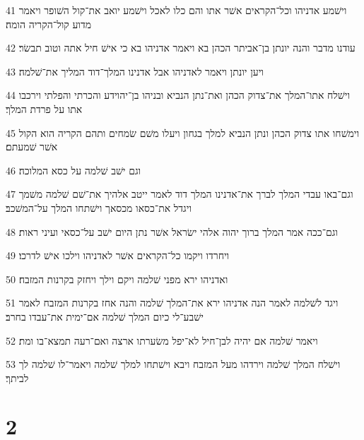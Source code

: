 \par 41 וישׁמע אדניהו וכל־הקראים אשׁר אתו והם כלו לאכל וישׁמע יואב את־קול השׁופר ויאמר מדוע קול־הקריה הומה׃
\par 42 עודנו מדבר והנה יונתן בן־אביתר הכהן בא ויאמר אדניהו בא כי אישׁ חיל אתה וטוב תבשׂר׃
\par 43 ויען יונתן ויאמר לאדניהו אבל אדנינו המלך־דוד המליך את־שׁלמה׃
\par 44 וישׁלח אתו־המלך את־צדוק הכהן ואת־נתן הנביא ובניהו בן־יהוידע והכרתי והפלתי וירכבו אתו על פרדת המלך׃
\par 45 וימשׁחו אתו צדוק הכהן ונתן הנביא למלך בגחון ויעלו משׁם שׂמחים ותהם הקריה הוא הקול אשׁר שׁמעתם׃
\par 46 וגם ישׁב שׁלמה על כסא המלוכה׃
\par 47 וגם־באו עבדי המלך לברך את־אדנינו המלך דוד לאמר ייטב אלהיך את־שׁם שׁלמה משׁמך ויגדל את־כסאו מכסאך וישׁתחו המלך על־המשׁכב׃
\par 48 וגם־ככה אמר המלך ברוך יהוה אלהי ישׂראל אשׁר נתן היום ישׁב על־כסאי ועיני ראות׃
\par 49 ויחרדו ויקמו כל־הקראים אשׁר לאדניהו וילכו אישׁ לדרכו׃
\par 50 ואדניהו ירא מפני שׁלמה ויקם וילך ויחזק בקרנות המזבח׃
\par 51 ויגד לשׁלמה לאמר הנה אדניהו ירא את־המלך שׁלמה והנה אחז בקרנות המזבח לאמר ישׁבע־לי כיום המלך שׁלמה אם־ימית את־עבדו בחרב׃
\par 52 ויאמר שׁלמה אם יהיה לבן־חיל לא־יפל משׂערתו ארצה ואם־רעה תמצא־בו ומת׃
\par 53 וישׁלח המלך שׁלמה וירדהו מעל המזבח ויבא וישׁתחו למלך שׁלמה ויאמר־לו שׁלמה לך לביתך׃

\chapter{2}

